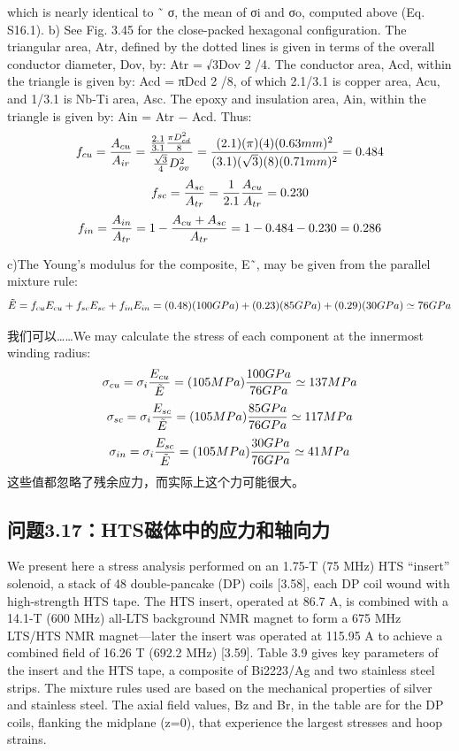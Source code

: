 which is nearly identical to ˜ σ, the mean of σi and σo, computed above (Eq. S16.1).
b) See Fig. 3.45 for the close-packed hexagonal configuration. The triangular
area, Atr, defined by the dotted lines is given in terms of the overall conductor
diameter, Dov, by: Atr = √3Dov 2 /4. The conductor area, Acd, within the triangle
is given by: Acd = πDcd 2 /8, of which 2.1/3.1 is copper area, Acu, and 1/3.1 is
Nb-Ti area, Asc. The epoxy and insulation area, Ain, within the triangle is given
by: Ain = Atr − Acd. Thus:
$$
f_{cu}=\frac{A_{cu}}{A_{ir}}=\frac{\frac{2.1}{3.1}\frac{\pi D_{cd}^{2}}{8}}{\frac{\sqrt{3}}{4}D_{ov}^{2}}=\frac{(2.1)(\pi)(4)(0.63mm)^{2}}{(3.1)(\sqrt{3})(8)(0.71mm)^{2}}=0.484\\%
$$
$$
f_{sc}=\frac{A_{sc}}{A_{tr}}=\frac{1}{2.1}\frac{A_{cu}}{A_{tr}}=0.230\\%
$$
$$
f_{in}=\frac{A_{in}}{A_{tr}}=1-\frac{A_{cu}+A_{sc}}{A_{tr}}=1-0.484-0.230=0.286\\%
$$

c)The Young’s modulus for the composite, E˜, may be given from the parallel
mixture rule:
$$
\tilde{E}=f_{cu}E_{cu}+f_{sc}E_{sc}+f_{in}E_{in}\\%
=(0.48)(100GPa)+(0.23)(85GPa)+(0.29)(30GPa)\\
\simeq76GPa
$$

我们可以……We may calculate the stress of each component at the innermost winding radius:
$$
\sigma_{cu}=\sigma_{i}\frac{E_{cu}}{\tilde{E}}=(105MPa)\frac{100GPa}{76GPa}\simeq137MPa\\%
$$
$$
\sigma_{sc}=\sigma_{i}\frac{E_{sc}}{\tilde{E}}=(105MPa)\frac{85GPa}{76GPa}\simeq117MPa\\%
$$
$$
\sigma_{in}=\sigma_{i}\frac{E_{sc}}{\tilde{E}}=(105MPa)\frac{30GPa}{76GPa}\simeq41MPa\\%
$$
这些值都忽略了残余应力，而实际上这个力可能很大。
\newpage



\subsection{问题3.17：HTS磁体中的应力和轴向力}
We present here a stress analysis performed on an 1.75-T (75 MHz) HTS “insert”
solenoid, a stack of 48 double-pancake (DP) coils [3.58], each DP coil wound with
high-strength HTS tape. The HTS insert, operated at 86.7 A, is combined with a
14.1-T (600 MHz) all-LTS background NMR magnet to form a 675 MHz LTS/HTS
NMR magnet—later the insert was operated at 115.95 A to achieve a combined
field of 16.26 T (692.2 MHz) [3.59]. Table 3.9 gives key parameters of the insert
and the HTS tape, a composite of Bi2223/Ag and two stainless steel strips. The
mixture rules used are based on the mechanical properties of silver and stainless
steel. The axial field values, Bz and Br, in the table are for the DP coils, flanking
the midplane (z=0), that experience the largest stresses and hoop strains.

